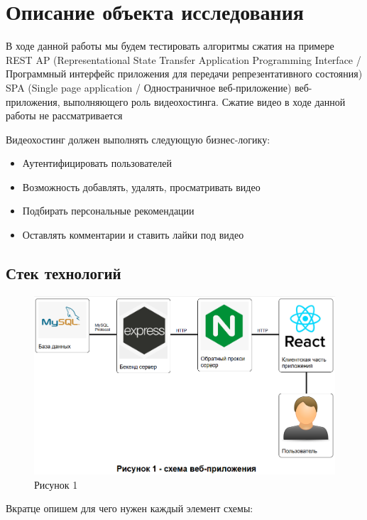\documentclass[12pt]{article}
\begin{document}
\section{Описание объекта исследования}

В ходе данной работы мы будем тестировать алгоритмы сжатия на примере REST AP
(Representational State Transfer Application Programming Interface / Программный интерфейс приложения для передачи репрезентативного состояния)
SPA (Single page application / Одностраничное веб-приложение) веб-приложения, выполняющего роль видеохостинга.
Сжатие видео в ходе данной работы не рассматривается

Видеохостинг должен выполнять следующую бизнес-логику:

\begin{itemize}
    \item Аутентифицировать пользователей
    \item Возможность добавлять, удалять, просматривать видео
    \item Подбирать персональные рекомендации
    \item Оставлять комментарии и ставить лайки под видео
\end{itemize}

\subsection{Стек технологий}

\begin{figure}[H]
    \centering
    \includegraphics[width=1\textwidth]{../images/Схема_веб-приложения.png}
    \caption{Рисунок 1}
\end{figure}

Вкратце опишем для чего нужен каждый элемент схемы:
\end{document}
